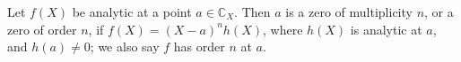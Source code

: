 Let $f(X)$ be analytic at a point $a \in \mathbb{C}_X$. Then $a$ is a zero of multiplicity $n$, or a zero of order $n$, if $f(X) = (X - a)^n h(X)$, where $h(X)$ is analytic at $a$, and $h(a) \neq 0$; we also say $f$ has order $n$ at $a$.
